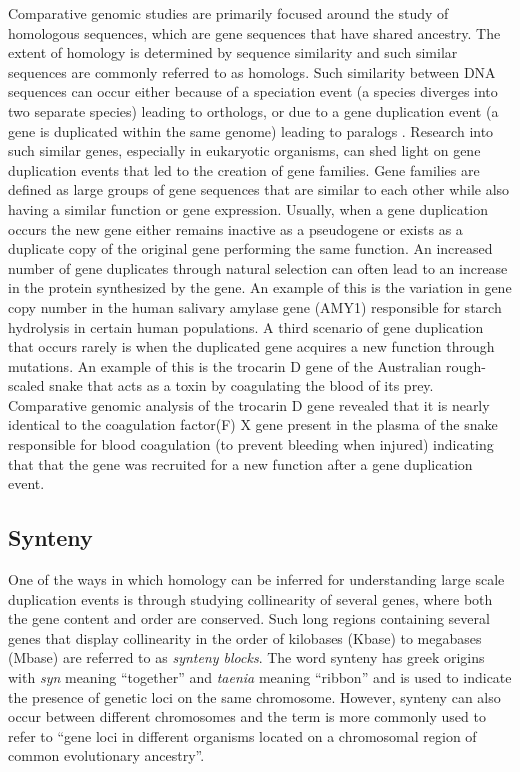 Comparative genomic studies are primarily focused around the study of homologous sequences, which are gene sequences that have shared ancestry. The extent of homology is determined by sequence similarity and such similar sequences are commonly referred to as homologs. Such similarity between DNA sequences can occur either because of a speciation event (a species diverges into two separate species) leading to orthologs, or due to a gene duplication event (a gene is duplicated within the same genome) leading to paralogs \cite{jensen2001orthologs}. Research into such similar genes, especially in eukaryotic organisms, can shed light on gene duplication events that led to the creation of gene families\cite{rubin2000comparative}. Gene families are defined as large groups of gene sequences that are similar to each other while also having a similar function or gene expression. Usually, when a gene duplication occurs the new gene either remains inactive as a pseudogene or exists as a duplicate copy of the original gene performing the same function. An increased number of gene duplicates through natural selection can often lead to an increase in the protein synthesized by the gene. An example of this is the variation in gene copy number in the human salivary amylase gene (AMY1) responsible for starch hydrolysis in certain human populations\cite{perry2007diet}. A third scenario of gene duplication that occurs rarely is when the duplicated gene acquires a new function through mutations. An example of this is the trocarin D gene of the Australian rough-scaled snake that acts as a toxin by coagulating the blood of its prey. Comparative genomic analysis of the trocarin D gene revealed that it is nearly identical to the coagulation factor(F) X gene present in the plasma of the snake responsible for blood coagulation (to prevent bleeding when injured) indicating that that the gene was recruited for a new function after a gene duplication event\cite{reza2007structure}.

\subsection{Synteny}
One of the ways in which homology can be inferred for understanding large scale duplication events is through studying collinearity of several genes, where both the gene content and order are conserved\cite{proost2011adhore}. Such long regions containing several genes that display collinearity in the order of kilobases (Kbase) to megabases (Mbase) are referred to as \textit{synteny blocks}\cite{zeng2008orthocluster}. The word synteny has greek origins with \textit{syn} meaning ``together'' and \textit{taenia} meaning ``ribbon'' and is used to indicate the presence of genetic loci on the same chromosome\cite{renwick1971mapping}. However, synteny can also occur between different chromosomes and the term is more commonly used to refer to ``gene loci in different organisms located on a chromosomal region of common evolutionary ancestry''\cite{passarge1999incorrect}.

